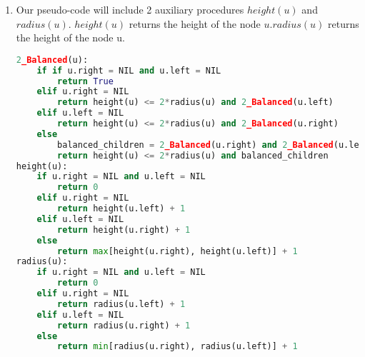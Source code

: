 \documentclass{article}
\begin{document}
\begin{enumerate}
\item 
Our pseudo-code will include 2 auxiliary procedures $height(u)$ and $radius(u)$. $height(u)$ returns the height of the node $u$.$radius(u)$ returns the height of the node u.\\
\lstset{numbers=left, numberstyle=\tiny, stepnumber=1, numbersep=5pt}
\begin{lstlisting}[language=Python]
2_Balanced(u): 
    if if u.right = NIL and u.left = NIL
        return True
    elif u.right = NIL 
        return height(u) <= 2*radius(u) and 2_Balanced(u.left)
    elif u.left = NIL
        return height(u) <= 2*radius(u) and 2_Balanced(u.right)
    else
        balanced_children = 2_Balanced(u.right) and 2_Balanced(u.left)
        return height(u) <= 2*radius(u) and balanced_children
height(u):
    if u.right = NIL and u.left = NIL
        return 0
    elif u.right = NIL 
        return height(u.left) + 1
    elif u.left = NIL
        return height(u.right) + 1
    else
        return max[height(u.right), height(u.left)] + 1
radius(u):
    if u.right = NIL and u.left = NIL
        return 0
    elif u.right = NIL 
        return radius(u.left) + 1
    elif u.left = NIL
        return radius(u.right) + 1
    else
        return min[radius(u.right), radius(u.left)] + 1
\end{lstlisting}
\end{enumerate}
\end{document}
